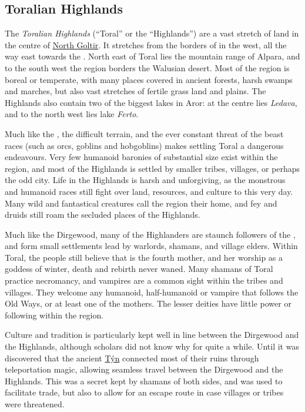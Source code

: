 \subsection{Toralian Highlands}
\label{sec:Toralian Highlands}

The \emph{Toralian Highlands} (``Toral'' or the ``Highlands'') are a vast
stretch of land in the centre of \hyperref[sec:Goltir]{North Goltir}. It
stretches from the borders of  in the west, all the way east
towards the . North east of Toral lies the
mountain range of Alpara, and to the south west the region borders the Walusian
desert. Most of the region is boreal or temperate, with many places covered
in ancient forests, harsh swamps and marches, but also vast stretches of
fertile grass land and plains. The Highlands also contain two of the biggest
lakes in Aror: at the centre lies \emph{Ledava}, and to the north west lies
lake \emph{Ferto}.

Much like the , the difficult terrain, and the ever
constant threat of the beast races (such as orcs, goblins and hobgoblins)
makes settling Toral a dangerous endeavours. Very few humanoid baronies of
substantial size exist within the region, and most of the Highlands is settled
by smaller tribes, villages, or perhaps the odd city. Life in the Highlands is
harsh and unforgiving, as the monstrous and humanoid races still fight over
land, resources, and culture to this very day. Many wild and fantastical
creatures call the region their home, and fey and druids still roam the
secluded places of the Highlands.

Much like the Dirgewood, many of the Highlanders are staunch followers of
the , and form small settlements lead by warlords,
shamans, and village elders. Within Toral, the people still believe that
 is the fourth mother, and her worship as a goddess of
winter, death and rebirth never waned. Many shamans of Toral practice
necromancy, and vampires are a common sight within the tribes and villages.
They welcome any humanoid, half-humanoid or vampire that follows the Old Ways,
or at least one of the mothers. The lesser deities have little power or
following within the region.

Culture and tradition is particularly kept well in line between the Dirgewood
and the Highlands, although scholars did not know why for quite a while. Until
it was discovered that the ancient \hyperref[sec:Tynrikke]{Týn} connected most
of their ruins through teleportation magic, allowing seamless travel between
the Dirgewood and the Highlands. This was a secret kept by shamans of both
sides, and was used to facilitate trade, but also to allow for an escape route
in case villages or tribes were threatened.

